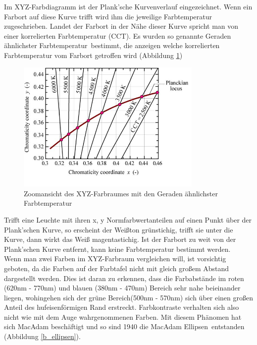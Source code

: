 
Im XYZ-Farbdiagramm ist der Plank'sche Kurvenverlauf eingezeichnet. Wenn ein Farbort auf diese Kurve trifft wird ihm die jeweilige Farbtemperatur zugeschrieben. Landet der Farbort in der Nähe dieser Kurve spricht man von einer korrelierten Farbtemperatur (CCT).  Es wurden so genannte \glqq Geraden ähnlichster Farbtemperatur\grqq\ bestimmt, die anzeigen welche korrelierten Farbtemperatur vom Farbort getroffen wird (Abbildung \ref{b_cct})    

\begin{figure}[H]     %
\centering
\includegraphics[width=0.8\textwidth]{bilder/cct} 
\caption {Zoomansicht des XYZ-Farbraumes mit den \glqq Geraden ähnlichster Farbtemperatur\grqq\ \protect\footnotemark}\label{b_cct}
\end{figure}


Trifft eine Leuchte mit ihren x, y Normfarbwertanteilen auf einen Punkt über der Plank'schen Kurve, so erscheint der Weißton grünstichig, trifft sie unter die Kurve, dann wirkt das Weiß magentastichig. Ist der Farbort zu weit von der Plank'schen Kurve entfernt, kann keine Farbtemperatur bestimmt werden.\\

Wenn man zwei Farben im XYZ-Farbraum vergleichen will, ist vorsichtig geboten, da die Farben auf der Farbtafel nicht mit gleich großem Abstand dargestellt werden. Dies ist daran zu erkennen, dass die Farbabstände im roten (620nm - 770nm) und blauen (380nm - 470nm) Bereich sehr nahe beieinander liegen, wohingehen sich der grüne Bereich(500nm - 570nm) sich über einen großen Anteil des hufeisenförmigen Rand erstreckt. Farbkontraste verhalten sich also nicht wie mit dem Auge wahrgenommenen Farben. Mit diesem Phänomen hat sich MacAdam beschäftigt und so sind 1940 die \glqq MacAdam Ellipsen\grqq\ entstanden (Abbildung \ref{b_ellipsen}).

